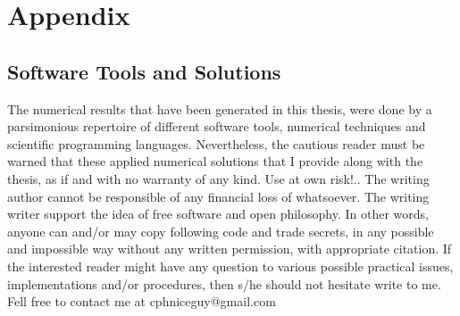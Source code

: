 \documentclass[a4paper,11pt,english]{article}
\begin{document}
		
		


	\section{Appendix}		


		\subsection{Software Tools and Solutions} 
		
		The numerical results that have been generated in this thesis, were done by a parsimonious repertoire of different software tools, numerical 
		techniques and scientific programming languages. Nevertheless, the cautious reader must be warned that these applied numerical solutions that I 
		provide along with the thesis, as if and with no warranty of any kind. Use at own risk!.. The writing author cannot be responsible of any financial 
		loss of whatsoever. The writing writer support the idea of free software and open philosophy. In other words, anyone can and/or may copy following 
		code and trade secrets, in any possible and impossible way without any written permission, with appropriate citation. If the interested reader 
		might have any question to 
		various possible practical issues,  implementations and/or procedures, then s/he should not hesitate write to me. Fell free to contact me 
		at cphniceguy@gmail.com
				 
\end{document}
